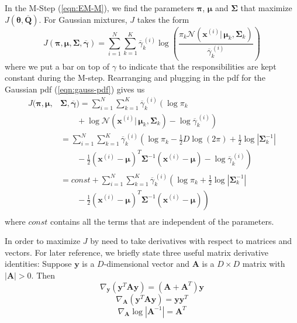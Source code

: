 \documentclass[final,3p,times,twocolumn]{elsarticle}
\let\bs\boldsymbol
\let\ol\overline
\begin{document}
In the M-Step (\ref{eqn:EM-M}), we find the parameters $\bs\pi$, $\bs\mu$ and $\bs\Sigma$ that maximize $J(\bs\theta,\ol{\bs Q})$.
For Gaussian mixtures, $J$ takes the form
\begin{equation}
J(\bs\pi,\bs\mu,\bs\Sigma,\ol{\bs\gamma}) = \sum_{i=1}^N \sum_{k=1}^K \ol\gamma_k^{\,(i)} \log\left(\frac{\pi_k\mathcal{N}(\bs x^{(i)}|\,\bs\mu_k,\bs\Sigma_k)}{\ol\gamma_k^{\,(i)}}\right)
\end{equation}
where we put a bar on top of $\gamma$ to indicate that the responsibilities are kept constant during the M-step.
Rearranging and plugging in the pdf for the Gaussian pdf (\ref{eqn:gauss-pdf}) gives us
\begin{equation}
\begin{split}
J(\bs\pi,\bs\mu,&\bs\Sigma,\ol{\bs\gamma}) = \sum_{i=1}^N\sum_{k=1}^K \ol\gamma_k^{\,(i)} \left(\log\pi_k \right.\\
&\left.\qquad+\log\mathcal{N}(\bs x^{(i)}|\,\bs\mu_k,\bs\Sigma_k) - \log\ol\gamma_k^{\,(i)}\right)\\
&= \sum_{i=1}^N\sum_{k=1}^K \ol\gamma_k^{\,(i)} \left(\log\pi_k -\frac{1}{2}D\log(2\pi) + \frac{1}{2}\log|\bs\Sigma_k^{-1}|\right.\\
&\left.\qquad -\frac{1}{2}(\bs x^{(i)}-\bs\mu)^T\bs\Sigma^{-1}(\bs x^{(i)}-\bs\mu) - \log\ol\gamma_k^{\,(i)}\right)\\
&= const + \sum_{i=1}^N\sum_{k=1}^K \ol\gamma_k^{\,(i)} \left(\log\pi_k + \frac{1}{2}\log|\bs\Sigma_k^{-1}|\right.\\
&\left.\qquad -\frac{1}{2}(\bs x^{(i)}-\bs\mu)^T\bs\Sigma^{-1}(\bs x^{(i)}-\bs\mu)\right)\\
\end{split}
\end{equation}
where $const$ contains all the terms that are independent of the parameters.

In order to maximize $J$ by need to take derivatives with respect to matrices and vectors.
For later reference, we briefly state three useful matrix derivative identities:
Suppose $\bs y$ is a $D$-dimensional vector and $\bs A$ is a $D\times D$ matrix with $|\bs A| > 0$.
Then
\begin{equation}
\label{eqn:derivative1}
\nabla_{\bs y} (\bs y^T \bs A \bs y) = (\bs A + \bs A^T)\bs y
\end{equation}
\begin{equation}
\label{eqn:derivative2}
\nabla_{\bs A} (\bs y^T \bs A \bs y) = \bs y \bs y^T
\end{equation}
\begin{equation}
\label{eqn:derivative3}
\nabla_{\bs A} \log\left|\bs A^{-1}\right| = \bs A^T
\end{equation}
\end{document}

